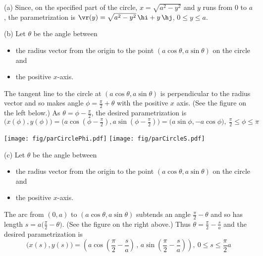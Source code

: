 \begin{solution} 
(a) 
Since, on the specified part of the  circle, 
$x=\sqrt{a^2-y^2}$ and  $y$ runs from $0$ to $a$, 
the parametrization is
$\vr(y)=\sqrt{a^2-y^2}\,\hi+ y\,\hj$, $0\le y\le a$.

(b) Let $\theta$ be the angle between 
\begin{itemize}\itemsep1pt \parskip0pt 
\item the radius vector from the origin to the point 
$(a\cos\theta,a\sin\theta)$  on the circle and 
\item
the positive $x$-axis. 
\end{itemize}
The tangent line to the circle at $(a\cos\theta,a\sin\theta)$ 
is perpendicular to the radius vector and so makes angle $\phi=\frac{\pi}{2}+\theta$ with the positive $x$ axis.
(See the figure on the left below.)
As $\theta =\phi-\frac{\pi}{2}$, the desired parametrization is
\begin{equation*}
\big(x(\phi),y(\phi)\big)
=\big(a\cos(\phi-\tfrac{\pi}{2}),a\sin(\phi-\tfrac{\pi}{2})\big)
=\big(a\sin \phi ,-a\cos \phi \big),\ 
  \tfrac{\pi}{2}\le\phi\le\pi
\end{equation*}

\begin{center}
       \texttt{[image: fig/parCirclePhi.pdf]}\quad
       \texttt{[image: fig/parCircleS.pdf]}
\end{center}


(c) Let $\theta$ be the angle between 
\begin{itemize}\itemsep1pt \parskip0pt 
\item the radius vector from the origin to the point 
$(a\cos\theta,a\sin\theta)$  on the circle and 
\item
the positive $x$-axis. 
\end{itemize} 
The arc from $(0,a)$ to $(a\cos\theta,a\sin\theta)$ 
subtends an angle $\frac{\pi}{2}-\theta$ and so
has length $s=a\big(\frac{\pi}{2}-\theta\big)$. (See the figure
on the right above.) Thus $\theta=\frac{\pi}{2}-\frac{s}{a}$
and the desired parametrization is
\begin{equation*}
\big(x(s),y(s)\big)
=\left(a\cos\left(\frac{\pi}{2}-\frac{s}{a}\right)\,,\,
           a\sin\left(\frac{\pi}{2}-\frac{s}{a}\right)\right)
,\ 0\le s\le\frac{\pi}{2}a
\end{equation*}
\end{solution}





